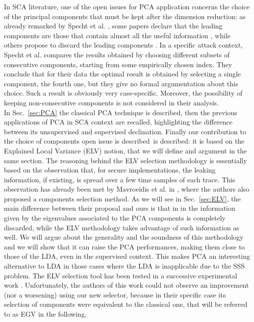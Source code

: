 In SCA literature, one of the open issues for PCA application concerns the choice of the principal components that must be kept after the dimension reduction: as already remarked by Specht et al.  \cite{specht}, some papers declare that the leading components are those that contain almost all the useful information \cite{TAprincipal,choudary2014efficient}, while others propose to discard the leading components \cite{Batina2012}. In a specific attack context, Specht et al. compares the results obtained by choosing different subsets of consecutive components, starting from some empirically chosen index. They conclude that for their data the optimal result is obtained by selecting a single component, the fourth one, but they give no formal argumentation about this choice. Such a result is obviously very case-specific. Moreover, the possibility of keeping non-consecutive components is not considered in their analysis. \\

 
In Sec.~\ref{sec:PCA} the classical PCA technique is described, then the previous applications of PCA in SCA context are recalled, highlighting the difference between its unsupervised and supervised declination. Finally our contribution to  \textquotedbl the choice of components open issue is described\textquotedbl \  is described:  it is based on the Explained Local Variance (ELV) notion, that we will define and argument in the same section. The reasoning behind the ELV selection methodology is essentially based on the observation that, for secure implementations, the leaking information, if existing, is spread over a few time samples of each trace. This observation has already been met by Mavroeidis et al. in \cite{SCAclassProbl}, where the authors  also proposed a components selection method. As we will see in Sec.~\ref{sec:ELV}, the main difference between their proposal and ours is that in in \cite{SCAclassProbl} the information given by the eigenvalues associated to the PCA components is completely discarded, while the ELV methodology takes advantage of such information as well.  We will argue about the generality and the soundness of this methodology and we will show that it can raise the PCA performances, making them close to those of the LDA, even in the supervised context. This makes PCA an interesting alternative to LDA in those cases where the LDA is inapplicable due to the SSS problem. The ELV selection tool has been tested in a successive experimental work \cite{choudary2018efficient}. Unfortunately, the authors of this work could not observe an improvement (nor a worsening) using our new selector, because in their specific case its selection of components were equivalent to the classical one, that will be referred to as EGV in the following.\\

